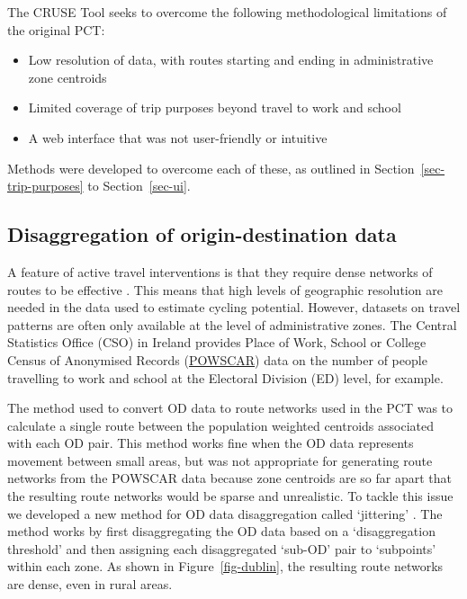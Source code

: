 \documentclass[
  super,
  preprint,
  3p]{elsarticle}
\providecommand{\tightlist}{%
  \setlength{\itemsep}{0pt}\setlength{\parskip}{0pt}}\usepackage{longtable,booktabs,array}
\begin{document}
The CRUSE Tool seeks to overcome the following methodological
limitations of the original PCT:

\begin{itemize}
\tightlist
\item
  Low resolution of data, with routes starting and ending in
  administrative zone centroids
\item
  Limited coverage of trip purposes beyond travel to work and school
\item
  A web interface that was not user-friendly or intuitive
\end{itemize}

Methods were developed to overcome each of these, as outlined in
Section~\ref{sec-trip-purposes} to Section~\ref{sec-ui}.

\hypertarget{sec-disaggregation}{%
\subsection{Disaggregation of origin-destination
data}\label{sec-disaggregation}}

A feature of active travel interventions is that they require dense
networks of routes to be effective \citep{parkin2018}. This means that
high levels of geographic resolution are needed in the data used to
estimate cycling potential. However, datasets on travel patterns are
often only available at the level of administrative zones. The Central
Statistics Office (CSO) in Ireland provides Place of Work, School or
College Census of Anonymised Records
(\href{https://www.cso.ie/en/census/census2016reports/powscar/}{POWSCAR})
data on the number of people travelling to work and school at the
Electoral Division (ED) level, for example.

The method used to convert OD data to route networks used in the PCT was
to calculate a single route between the population weighted centroids
associated with each OD pair. This method works fine when the OD data
represents movement between small areas, but was not appropriate for
generating route networks from the POWSCAR data because zone centroids
are so far apart that the resulting route networks would be sparse and
unrealistic. To tackle this issue we developed a new method for OD data
disaggregation called `jittering' \citep{lovelace2022}. The method works
by first disaggregating the OD data based on a `disaggregation
threshold' and then assigning each disaggregated `sub-OD' pair to
`subpoints' within each zone. As shown in Figure~\ref{fig-dublin}, the
resulting route networks are dense, even in rural areas.
\end{document}
